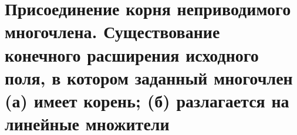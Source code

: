 \section{Присоединение корня неприводимого многочлена. Существование конечного расширения исходного поля, в котором заданный многочлен (а) имеет корень; (б) разлагается на линейные множители}